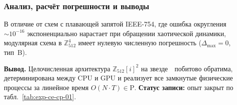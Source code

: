 \subsubsection*{Анализ, расчёт погрешности и выводы}
В отличие от схем с плавающей запятой IEEE-754, где ошибка округления $\sim 10^{-16}$ экспоненциально нарастает при обращении хаотической динамики, модулярная схема в $\mathbb{Z}_{512}^4$ имеет нулевую численную погрешность ($\Delta_{\max} = 0$, тип~B).

\textbf{Вывод.}
Целочисленная архитектура $\mathbb{Z}_{512}[i]^2$ на звезде~\latGCKshort\ побитово обратима, детерминирована между CPU и GPU и реализует все замкнутые физические процессы за линейное время $O(N\cdot T)\in\mathrm{P}$.
\textbf{Статус записи:} опыт закрыт по табл.~\ref{tab:exp-ce-cp-01}.
